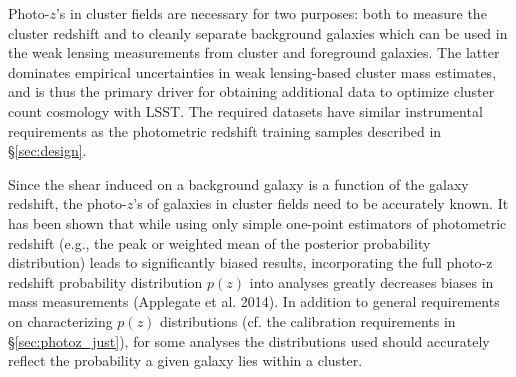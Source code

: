 Photo-$z$'s in cluster fields are necessary for two purposes: both to measure the cluster redshift and to cleanly separate background galaxies which can be used in the weak lensing measurements from cluster and foreground galaxies.  The latter dominates empirical uncertainties in weak lensing-based cluster mass estimates, and is thus the primary driver for obtaining additional data to optimize cluster count cosmology with LSST.  The required datasets have similar instrumental requirements as the photometric redshift training samples described in \S \ref{sec:design}.

Since the shear induced on a background galaxy is a function of the galaxy redshift, the photo-$z$'s of galaxies in cluster fields need to be accurately known.  It has been shown that while using only simple one-point estimators of photometric redshift (e.g., the peak or weighted mean of the posterior probability distribution) leads to significantly biased results, incorporating the full photo-z redshift probability distribution $p(z)$ into analyses greatly decreases biases in mass measurements (Applegate et al. 2014).  In addition to general requirements on characterizing $p(z)$ distributions (cf. the calibration requirements in \S \ref{sec:photoz_just}), for some analyses the distributions used should accurately reflect the probability a given galaxy lies within a cluster.  

